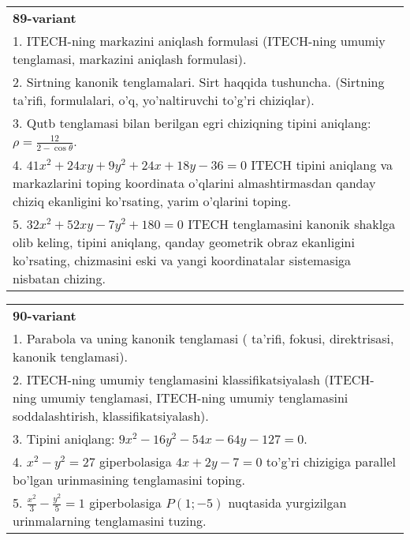 \documentclass{article}
\begin{document}
\begin{tabular}{m{17cm}}
\textbf{89-variant}\\
1. ITECH-ning markazini aniqlash formulasi (ITECH-ning umumiy tenglamasi, markazini aniqlash formulasi).\\

2. Sirtning kanonik tenglamalari. Sirt haqqida tushuncha. (Sirtning ta'rifi, formulalari, o'q, yo'naltiruvchi to'g'ri chiziqlar).\\

3. Qutb tenglamasi bilan berilgan egri chiziqning tipini aniqlang: $\rho=\frac{12}{2-\cos\theta}$.\\

4. $41x^{2} + 24xy + 9y^{2} + 24x + 18y - 36 = 0$ ITECH tipini aniqlang va markazlarini toping koordinata o'qlarini almashtirmasdan qanday chiziq ekanligini ko'rsating, yarim o'qlarini toping.  \\

5. $32x^{2} + 52xy - 7y^{2} + 180 = 0$ ITECH tenglamasini kanonik shaklga olib keling, tipini aniqlang, qanday geometrik obraz ekanligini ko'rsating, chizmasini eski va yangi koordinatalar sistemasiga nisbatan chizing.  
\end{tabular}
\vspace{1cm}


\begin{tabular}{m{17cm}}
\textbf{90-variant}\\
1. Parabola va uning kanonik tenglamasi ( ta'rifi, fokusi, direktrisasi, kanonik tenglamasi).\\

2. ITECH-ning umumiy tenglamasini klassifikatsiyalash (ITECH-ning umumiy tenglamasi, ITECH-ning umumiy tenglamasini soddalashtirish, klassifikatsiyalash).\\

3. Tipini aniqlang: $9x^{2}-16y^{2}-54x-64y-127=0$.\\

4. $x^{2} - y^{2} = 27$ giperbolasiga $4x + 2y - 7 = 0$ to'g'ri chizigiga parallel bo'lgan urinmasining tenglamasini toping.  \\

5. $\frac{x^{2}}{3} - \frac{y^{2}}{5} = 1$ giperbolasiga $P(1; - 5)$ nuqtasida yurgizilgan urinmalarning tenglamasini tuzing.
\end{tabular}
\vspace{1cm}
\end{document}
